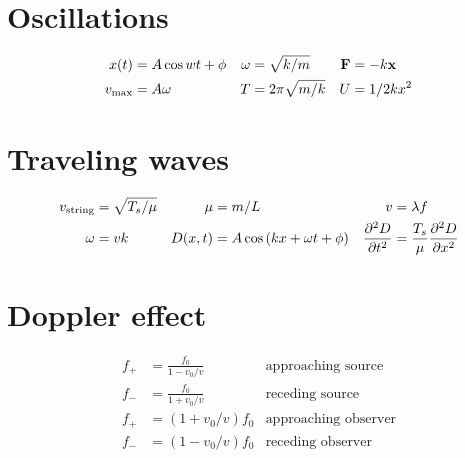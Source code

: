 \documentclass[10pt]{article}
\begin{document}
\section{Oscillations}

\begin{align*}
x(t) &= A\cos{wt+\phi}
&
\omega &= \sqrt{k/m}
&
\vb{F} &= -k\vb{x}
\\
v_{\text{max}} &= A\omega
&
T &= 2\pi \sqrt{m/k}
&
U &= 1/2kx^2
\end{align*}


\section{Traveling waves}

\begin{align*}
v_{\text{string}} &= \sqrt{T_s/\mu}
&
\mu &= m/L
&
v &= \lambda f
\\
\omega &= vk
&
D(x,t) &= A\cos{(kx + \omega t +\phi)}
&
\pdv[2]{D}{t} &= \frac{T_s}{\mu}\pdv[2]{D}{x}
\end{align*}

\section{Doppler effect}

\begin{align*}
f_+ &= \frac{f_0}{1-v_0/v}
&
\text{approaching source}
\\
f_- &= \frac{f_0}{1+v_0/v}
&
\text{receding source}
\\
f_+ &= (1+v_0/v)f_0
&
\text{approaching observer}
\\
f_- &= (1-v_0/v)f_0
&
\text{receding observer}
\end{align*}
\end{document}
